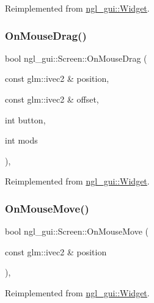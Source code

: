 Reimplemented from \mbox{\hyperlink{classngl__gui_1_1_widget_a721b18dc7a09b0b7b4ff0c02162409b8}{ngl\+\_\+gui\+::\+Widget}}.

\mbox{\label{classngl__gui_1_1_screen_a532892ea85fdc456ef7d891a1a21694e}} 
\subsubsection{\texorpdfstring{On\+Mouse\+Drag()}{OnMouseDrag()}}
{\footnotesize\ttfamily bool ngl\+\_\+gui\+::\+Screen\+::\+On\+Mouse\+Drag (\begin{DoxyParamCaption}\item[{const glm\+::ivec2 \&}]{position,  }\item[{const glm\+::ivec2 \&}]{offset,  }\item[{int}]{button,  }\item[{int}]{mods }\end{DoxyParamCaption})\hspace{0.3cm}{\ttfamily [override]}, {\ttfamily [virtual]}}



Reimplemented from \mbox{\hyperlink{classngl__gui_1_1_widget_aac19447b726ccec8ea22992b19edc676}{ngl\+\_\+gui\+::\+Widget}}.

\mbox{\label{classngl__gui_1_1_screen_a2f56b25db5dbde69c8c80404a55aa2fd}} 
\subsubsection{\texorpdfstring{On\+Mouse\+Move()}{OnMouseMove()}}
{\footnotesize\ttfamily bool ngl\+\_\+gui\+::\+Screen\+::\+On\+Mouse\+Move (\begin{DoxyParamCaption}\item[{const glm\+::ivec2 \&}]{position }\end{DoxyParamCaption})\hspace{0.3cm}{\ttfamily [override]}, {\ttfamily [virtual]}}



Reimplemented from \mbox{\hyperlink{classngl__gui_1_1_widget_ac5d4927cc0bd0300d0b2e00d9f64d176}{ngl\+\_\+gui\+::\+Widget}}.

